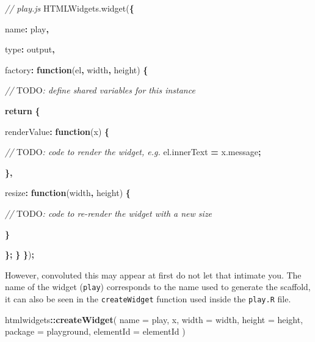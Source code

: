 \documentclass[
]{krantz}
\makeatletter
\newenvironment{Shaded}{\begin{snugshade}}{\end{snugshade}}
\newcommand{\AlertTok}[1]{\textcolor[rgb]{0.33,0.33,0.33}{#1}}
\newcommand{\AttributeTok}[1]{\textcolor[rgb]{0.61,0.61,0.61}{#1}}
\newcommand{\CommentTok}[1]{\textcolor[rgb]{0.37,0.37,0.37}{\textit{#1}}}
\newcommand{\ControlFlowTok}[1]{\textcolor[rgb]{0.27,0.27,0.27}{\textbf{#1}}}
\newcommand{\DataTypeTok}[1]{\textcolor[rgb]{0.27,0.27,0.27}{#1}}
\newcommand{\KeywordTok}[1]{\textcolor[rgb]{0.27,0.27,0.27}{\textbf{#1}}}
\newcommand{\NormalTok}[1]{#1}
\newcommand{\OperatorTok}[1]{\textcolor[rgb]{0.43,0.43,0.43}{\textbf{#1}}}
\newcommand{\StringTok}[1]{\textcolor[rgb]{0.5,0.5,0.5}{#1}}
\newcommand{\VariableTok}[1]{\textcolor[rgb]{0,0,0}{#1}}
\newenvironment{kframe}{%
\medskip{}
\setlength{\fboxsep}{.8em}
 \def\at@end@of@kframe{}%
 \ifinner\ifhmode%
  \def\at@end@of@kframe{\end{minipage}}%
  \begin{minipage}{\columnwidth}%
 \fi\fi%
 \def\FrameCommand##1{\hskip\@totalleftmargin \hskip-\fboxsep
 \colorbox{shadecolor}{##1}\hskip-\fboxsep
     \hskip-\linewidth \hskip-\@totalleftmargin \hskip\columnwidth}%
 \MakeFramed {\advance\hsize-\width
   \@totalleftmargin\z@ \linewidth\hsize
   \@setminipage}}%
 {\par\unskip\endMakeFramed%
 \at@end@of@kframe}
\renewenvironment{Shaded}{\begin{kframe}}{\end{kframe}}
\makeatother
\begin{document}
\begin{Shaded}
\begin{Highlighting}[]
\CommentTok{// play.js}
\VariableTok{HTMLWidgets}\NormalTok{.}\AttributeTok{widget}\NormalTok{(}\OperatorTok{\{}

  \DataTypeTok{name}\OperatorTok{:} \StringTok{\textquotesingle{}play\textquotesingle{}}\OperatorTok{,}

  \DataTypeTok{type}\OperatorTok{:} \StringTok{\textquotesingle{}output\textquotesingle{}}\OperatorTok{,}

  \DataTypeTok{factory}\OperatorTok{:} \KeywordTok{function}\NormalTok{(el}\OperatorTok{,}\NormalTok{ width}\OperatorTok{,}\NormalTok{ height) }\OperatorTok{\{}

    \CommentTok{// }\AlertTok{TODO}\CommentTok{: define shared variables for this instance}

    \ControlFlowTok{return} \OperatorTok{\{}

      \DataTypeTok{renderValue}\OperatorTok{:} \KeywordTok{function}\NormalTok{(x) }\OperatorTok{\{}

        \CommentTok{// }\AlertTok{TODO}\CommentTok{: code to render the widget, e.g.}
        \VariableTok{el}\NormalTok{.}\AttributeTok{innerText} \OperatorTok{=} \VariableTok{x}\NormalTok{.}\AttributeTok{message}\OperatorTok{;}

      \OperatorTok{\},}

      \DataTypeTok{resize}\OperatorTok{:} \KeywordTok{function}\NormalTok{(width}\OperatorTok{,}\NormalTok{ height) }\OperatorTok{\{}

        \CommentTok{// }\AlertTok{TODO}\CommentTok{: code to re{-}render the widget with a new size}

      \OperatorTok{\}}

    \OperatorTok{\};}
  \OperatorTok{\}}
\OperatorTok{\}}\NormalTok{)}\OperatorTok{;}
\end{Highlighting}
\end{Shaded}

However, convoluted this may appear at first do not let that intimate you. The name of the widget (\texttt{play}) corresponds to the name used to generate the scaffold, it can also be seen in the \texttt{createWidget} function used inside the \texttt{play.R} file.

\begin{Shaded}
\begin{Highlighting}[]
\NormalTok{htmlwidgets}\OperatorTok{::}\KeywordTok{createWidget}\NormalTok{(}
  \DataTypeTok{name =} \StringTok{\textquotesingle{}play\textquotesingle{}}\NormalTok{,}
\NormalTok{  x,}
  \DataTypeTok{width =}\NormalTok{ width,}
  \DataTypeTok{height =}\NormalTok{ height,}
  \DataTypeTok{package =} \StringTok{\textquotesingle{}playground\textquotesingle{}}\NormalTok{,}
  \DataTypeTok{elementId =}\NormalTok{ elementId}
\NormalTok{)}
\end{Highlighting}
\end{Shaded}
\end{document}
